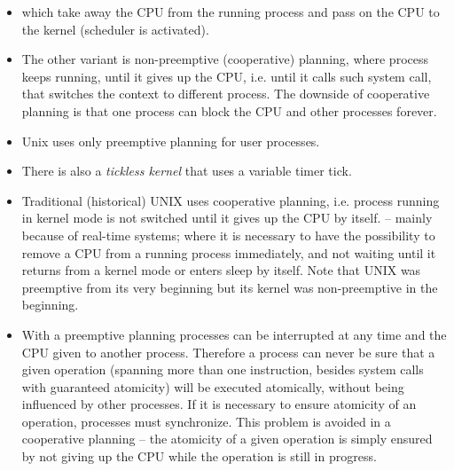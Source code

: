 \begin{itemize}
\item {}
which take away the CPU from the running process and pass on the CPU
to the kernel (scheduler is activated).
\item The other variant is non-preemptive (cooperative) planning, where process
keeps running, until it gives up the CPU, i.e. until it calls such system call,
that switches the context to different process. The downside of cooperative
planning is that one process can block the CPU and other processes forever.
\item Unix uses only preemptive planning for user processes.
\item There is also a \emph{tickless kernel} that uses a variable timer tick.
\item Traditional (historical) UNIX  uses cooperative planning,
i.e. process running in kernel mode is not switched until it gives up the CPU
by itself.
 -- mainly because of real-time
systems; where it is necessary to have the possibility to remove a CPU from
a running process immediately, and not waiting until it returns from a kernel
mode or enters sleep by itself. Note that UNIX was preemptive from its very
beginning but its kernel was non-preemptive in the beginning.
\item With a preemptive planning processes can be interrupted at any time and
the CPU given to another process. Therefore a process can never be sure
that a given operation (spanning more than one instruction, besides system calls
with guaranteed atomicity) will be executed atomically, without being
influenced by other processes. If it is necessary to ensure atomicity of an
operation, processes must synchronize. This problem is avoided in a cooperative
planning -- the atomicity of a given operation is simply ensured by not giving
up the CPU while the operation is still in progress.
\end{itemize}



